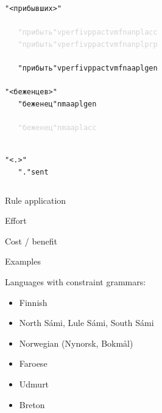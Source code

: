 \documentclass{beamer}
\begin{document}
\begin{frame}
\begin{columns}
\begin{tiny}
\begin{alltt}
~\\
"<прибывших>"\\
\textcolor{lightgray}{
~~~"прибыть" v perf iv pp actv mfn an pl acc  \\
~~~"прибыть" v perf iv pp actv mfn an pl prp \\
}
~~~"прибыть" v perf iv pp actv mfn aa pl gen
~\\
"<беженцев>"\\
~~~"беженец" n m aa pl gen\\
\textcolor{lightgray}{
~~~"беженец" n m aa pl acc
}

~\\
"<.>"\\
~~~"." sent
\end{alltt}
\end{tiny}
\end{columns}

\end{frame}

\begin{frame}{Rule application}


\end{frame}

\begin{frame}{Effort}


\end{frame}

\begin{frame}{Cost / benefit}

%

% 


\end{frame}

\begin{frame}{Examples}

Languages with constraint grammars:
\begin{itemize}
  \item Finnish
  \item North Sámi, Lule Sámi, South Sámi
  \item Norwegian (Nynorsk, Bokmål)
  \item Faroese
  \item Udmurt
  \item Breton
\end{itemize}

\end{frame}
\end{document}

